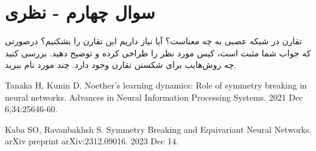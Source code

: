 \section{سوال چهارم - نظری}

تقارن در شبکه عصبی به چه معناست؟ آیا نیاز داریم این تقارن را بشکنیم؟ درصورتی که جواب شما مثبت است، کیس مورد نظر را طراحی کرده و توضیح دهید. بررسی کنید چه روش‌هایب برای شکستن تقارن وجود دارد. چند مورد نام ببرید.























\begin{latin}
	\begin{thebibliography}{9}
		Tanaka H, Kunin D. Noether’s learning dynamics: Role of symmetry breaking in neural networks. Advances in Neural Information Processing Systems. 2021 Dec 6;34:25646-60.
		
		Kaba SO, Ravanbakhsh S. Symmetry Breaking and Equivariant Neural Networks. arXiv preprint arXiv:2312.09016. 2023 Dec 14.
	\end{thebibliography} 
\end{latin}